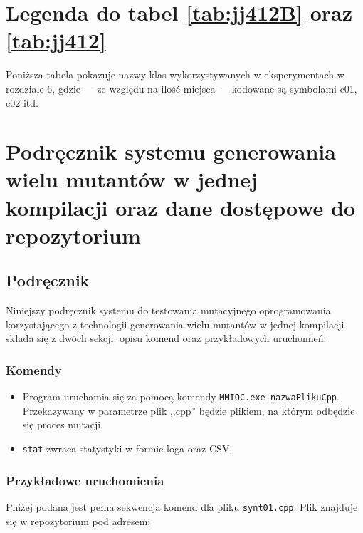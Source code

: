 \documentclass[11pt,a4paper,oldfontcommands]{memoir}
\theoremstyle{plain}
\theoremstyle{definition}
\theoremstyle{remark}
\begin{document}
\nocite{*}




\begin{appendices}

\chapter{Legenda do tabel \ref{tab:jj412B} oraz \ref{tab:jj412}}
Poniższa tabela pokazuje nazwy klas wykorzystywanych w eksperymentach w rozdziale 6, gdzie — ze względu na ilość miejsca — kodowane są symbolami c01, c02 itd.


\chapter{Podręcznik systemu generowania wielu mutantów w jednej kompilacji oraz dane dostępowe do repozytorium\label{Appendix:ManualMMIOC}}

\section{Podręcznik}
Niniejszy podręcznik systemu do testowania mutacyjnego oprogramowania korzystającego z technologii generowania wielu mutantów w jednej kompilacji składa się z dwóch sekcji: opisu komend oraz przykładowych uruchomień.

\subsection{Komendy}

\begin{itemize}
\item Program uruchamia się za pomocą komendy \texttt{MMIOC.exe nazwaPlikuCpp}. Przekazywany w parametrze plik ,,cpp'' będzie plikiem, na którym odbędzie się proces mutacji.  

\item \texttt{stat} zwraca statystyki w formie loga oraz CSV. 


\end{itemize}

\subsection{Przykładowe uruchomienia}

Pniżej podana jest pełna sekwencja komend dla pliku \texttt{synt01.cpp}. Plik znajduje się w repozytorium pod adresem:


\end{appendices}
\end{document}
